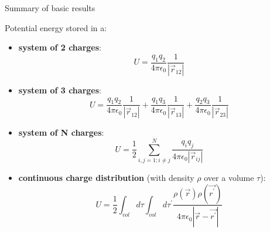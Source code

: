 \begin{frame}{Summary of basic results}

Potential energy stored in a:

\begin{itemize}
\item {\bf system of 2 charges}:
 \begin{equation*}
   U = \frac{q_1 q_2}{4\pi\epsilon_0} \frac{1}{|\vec{r}_{12}|}
 \end{equation*}

\item {\bf system of 3 charges}:
 \begin{equation*}
   U = \frac{q_1 q_2}{4\pi\epsilon_0} \frac{1}{|\vec{r}_{12}|} +
       \frac{q_1 q_3}{4\pi\epsilon_0} \frac{1}{|\vec{r}_{13}|} +
       \frac{q_2 q_3}{4\pi\epsilon_0} \frac{1}{|\vec{r}_{23}|}
 \end{equation*}

\item {\bf system of N charges}:
 \begin{equation*}
   U = \frac{1}{2} \sum_{i,j=1;i{\ne}j}^{N} \frac{q_i q_j}{4\pi\epsilon_0|\vec{r}_{ij}|}
 \end{equation*}

\item {\bf continuous charge distribution} (with density $\rho$ over a volume $\tau$):
 \begin{equation*}
    U = \frac{1}{2} \int_{vol} d\tau \int_{vol} d\tau^{\prime}
        \frac{\rho(\vec{r}) \rho(\vec{r^{\prime}})}{4\pi\epsilon_0|\vec{r} - \vec{r^{\prime}}|}
 \end{equation*}

\end{itemize}
\end{frame}



%
%

